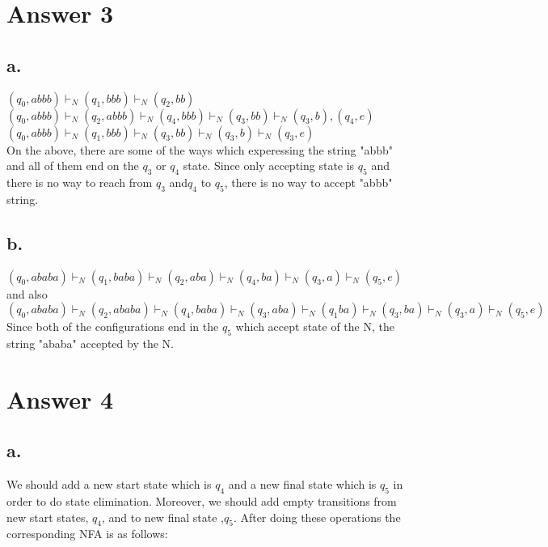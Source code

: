 \documentclass[12pt]{article}
\begin{document}
\section*{Answer 3}


\subsection*{a.}
$(q_0,abbb) \vdash_N (q_1,bbb) \vdash_N (q_2,bb)$ \\
$(q_0,abbb) \vdash_N (q_2,abbb) \vdash_N (q_4,bbb) \vdash_N (q_3,bb) \vdash_N (q_3,b),(q_4,e)$ \\
$(q_0,abbb)\vdash_N (q_1,bbb) \vdash_N (q_3,bb) \vdash_N (q_3,b) \vdash_N (q_3,e) $ \\

On the above, there are some of the ways which experessing the string "abbb" and all of them end on the $q_3$ or $q_4$ state.
Since only accepting state is $q_5$ and there is no way to reach from $q_3$ and$q_4 $ to $q_5$, there is no way to accept "abbb" string.


\subsection*{b.}
$(q_0,ababa) \vdash_N (q_1,baba) \vdash_N (q_2,aba) \vdash_N (q_4, ba) \vdash_N (q_3, a) \vdash_N (q_5, e)$ and also
$(q_0,ababa) \vdash_N (q_2, ababa) \vdash_N (q_4,baba) \vdash_N (q_3,aba) \vdash_N (q_1 ba) \vdash_N (q_3, ba) \vdash_N (q_3, a) \vdash_N (q_5,e)$
Since both of the configurations end in the $q_5$ which accept state of the N, the string "ababa" accepted by the N.




\section*{Answer 4}

\subsection*{a.}

We should add a new start state which is $q_4$ and a new final state which is $q_5$ in order to do state elimination. Moreover, we should add empty transitions from new start states, $q_4$, and to new final state ,$q_5$. After doing these operations the corresponding NFA is as follows:
\end{document}
